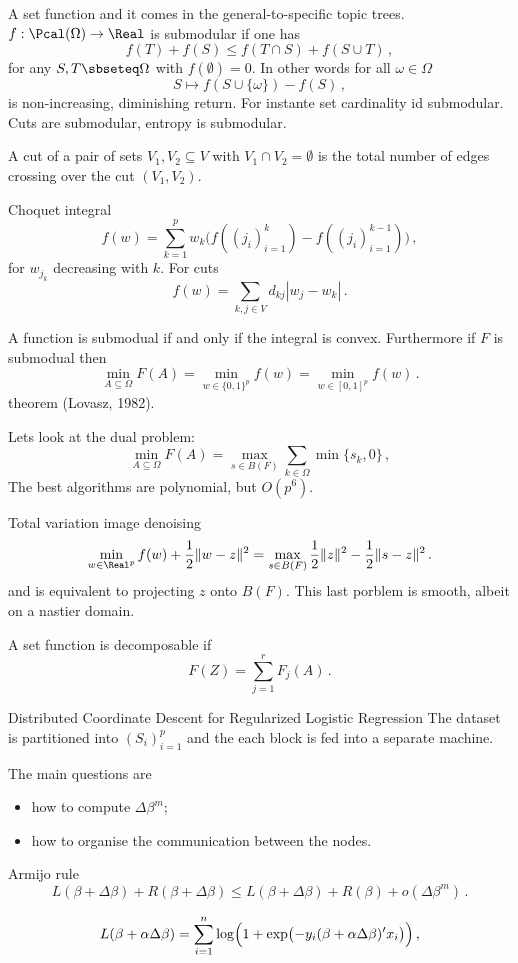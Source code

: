 A set function and it comes in the general-to-specific topic trees.
$f:\Pcal(\Omega)\to \Real$ is submodular if one has
\[ f(T) + f(S) \leq f(T \cap S) + f(S\cup T) \,, \]
for any $S, T \sbseteq \Omega$ with $f(\emptyset)=0$. In other words
for all $\omega\in\Omega$
\[ S \mapsto f(S\cup\{\omega\}) - f(S) \,, \]
is non-increasing, diminishing return. For instante set cardinality id submodular.
Cuts are submodular, entropy is submodular.

A cut of a pair of sets $V_1,V_2\subseteq V$ with $V_1\cap V_2 = \emptyset$
is the total number of edges crossing over the cut $(V_1, V_2)$.

Choquet integral
\[ f(w) = \sum_{k=1}^p w_k\bigl( f( (j_i)_{i=1}^k ) - f( (j_i)_{i=1}^{k-1} ) \bigr) \,, \]
for $w_{j_k}$ decreasing with $k$. For cuts 
\[ f(w) = \sum_{k,j\in V} d_{kj} |w_j-w_k| \,. \]

A function is submodual if and only if the integral is convex. Furthermore
if $F$ is submodual then
\[ \min_{A\subseteq \Omega} F(A) = \min_{w\in\{0,1\}^p} f(w)
								 = \min_{w\in[0,1]^p} f(w) \,. \]
theorem (Lovasz, 1982).

Lets look at the dual problem:
\[ \min_{A\subseteq \Omega} F(A) = \max_{s\in B(F)}\sum_{k\in \Omega} \min\{s_k, 0\} \,,\]
The best algorithms are polynomial, but $O(p^6)$.

Total variation image denoising
\[ \min_{w\in \Real^p} f(w) + \frac{1}{2}\|w-z\|^2
	= \max_{s\in B(F)} \frac{1}{2}\|z\|^2
						- \frac{1}{2}\|s-z\|^2 \,. \]
and is equivalent to projecting $z$ onto $B(F)$. This last porblem is smooth, 
albeit on a nastier domain.

A set function is decomposable if
\[ F(Z) = \sum_{j=1}^r F_j(A) \,. \]


Distributed Coordinate Descent for Regularized Logistic Regression
The dataset is partitioned into $(S_i)_{i=1}^p$ and the each block is fed into
a separate machine.

The main questions are \begin{itemize}
	\item how to compute $\Delta \beta^m$;
	\item how to organise the communication between the nodes.
\end{itemize}
Armijo rule
\[ L(\beta + \Delta \beta) + R(\beta + \Delta \beta)
	\leq L(\beta + \Delta \beta) + R(\beta) + o(\Delta \beta^m) \,.\]

\[ L(\beta + \alpha \Delta \beta) =
	\sum_{i=1}^n \log\Bigl(1+\text{exp}\bigl(-y_i (\beta + \alpha\Delta\beta)'x_i \bigr)\Bigr) \,,\]

